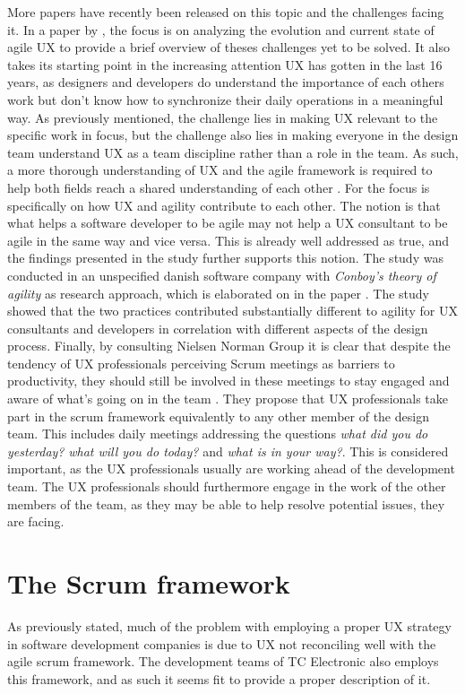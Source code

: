 \noindent
More papers have recently been released on this topic and the challenges facing it. In a paper by \textcite{PDF:EvolutionofagileUXD}, the focus is on analyzing the evolution and current state of agile UX to provide a brief overview of theses challenges yet to be solved. It also takes its starting point in the increasing attention UX has gotten in the last 16 years, as designers and developers do understand the importance of each others work but don't know how to synchronize their daily operations in a meaningful way. As previously mentioned, the challenge lies in making UX relevant to the specific work in focus, but the challenge also lies in making everyone in the design team understand UX as a team discipline rather than a role in the team. As such, a more thorough understanding of UX and the agile framework is required to help both fields reach a shared understanding of  each other \parencite[][2]{PDF:EvolutionofagileUXD}. For \textcite{WEB:AgilityForUX} the focus is specifically on how UX and agility contribute to each other. The notion is that what helps a software developer to be agile may not help a UX consultant to be agile in the same way and vice versa. This is already well addressed as true, and the findings presented in the study further supports this notion. The study was conducted in an unspecified danish software company with \textit{Conboy's theory of agility} as research approach, which is elaborated on in the paper \parencite[][3]{WEB:AgilityForUX}. The study showed that the two practices contributed substantially different to agility for UX consultants and developers in correlation with different aspects of the design process. Finally, by consulting Nielsen Norman Group it is clear that despite the tendency of UX professionals perceiving Scrum meetings as barriers to productivity, they should still be involved in these meetings to stay engaged and aware of what's going on in the team \parencite{WEB:UXResponsibilitiesInScrum}. They propose that UX professionals take part in the scrum framework equivalently to any other member of the design team. This includes daily meetings addressing the questions \textit{what did you do yesterday?} \textit{what will you do today?} and \textit{what is in your way?}. This is considered important, as the UX professionals usually are working ahead of the development team. The UX professionals should furthermore engage in the work of the other members of the team, as they may be able to help resolve potential issues, they are facing.

\section{The Scrum framework}
\label{scrum}
As previously stated, much of the problem with employing a proper UX strategy in software development companies is due to UX not reconciling well with the agile scrum framework. The development teams of TC Electronic also employs this framework, and as such it seems fit to provide a proper description of it.

